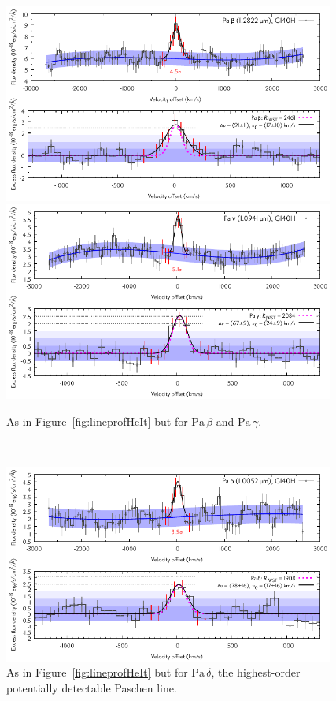 \documentclass[twocolumn,twocolumnappendix]{aastex631}
\def\Pab{\ensuremath{\mathrm{Pa}\,\beta}\xspace}            %
\def\Pag{\ensuremath{\mathrm{Pa}\,\gamma}\xspace}           %
\def\Pad{\ensuremath{\mathrm{Pa}\,\delta}\xspace}           %
\begin{document}
\begin{figure}
 \centering
 \includegraphics[width=0.97\textwidth]{TWA27b_g140h-f100lp_blauw_sigkorr_Pab_Dv2700_ohni300_Abb_simul.pdf}
 \includegraphics[width=0.97\textwidth]{TWA27b_g140h-f100lp_blauw_sigkorr_Pag_Dv2700_ohni300_Abb_simul.pdf}
\caption{%
As in Figure~\ref{fig:lineprofHeIt} but for \Pab and \Pag.
}
\label{fig:lineprofPabPag}
\end{figure}

~  %

\begin{figure}
 \centering
 \includegraphics[width=0.97\textwidth]{TWA27b_g140h-f100lp_blauw_sigkorr_Pad_Dv2700_ohni300_Abb_simul.pdf}
\caption{%
As in Figure~\ref{fig:lineprofHeIt} but for \Pad, the highest-order potentially detectable Paschen line. 
}
\label{fig:lineprofPad}
\end{figure}
\end{document}
